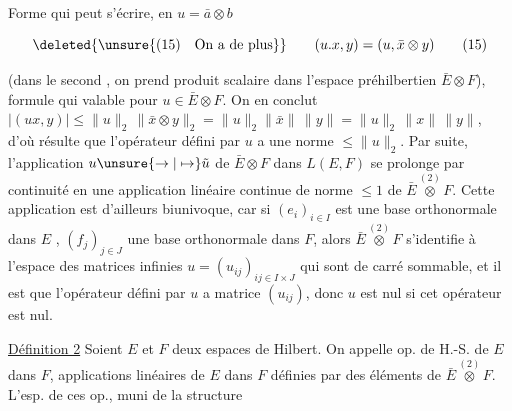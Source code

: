  Forme qui peut s'écrire, en    $u=\bar a\otimes b$


\[
\deleted{\unsure{(15)\quad\text{On a de plus}}}\qquad (u.x,y)=(u,\bar x\otimes y) \tag*{(15)}
\]

 
(dans le second , on prend  produit scalaire
dans l'espace préhilbertien $\bar E\otimes F$), formule qui
 valable  pour  $u\in\bar E\otimes F$. On en
conclut  $|(ux,y)|\leq\|u\|_2\,\|\bar x\otimes y\|_2=\|u\|_2\|\bar x\|\,\|y\|
=\|u\|_2\,\|x\|\,\|y\|$, d'où résulte que l'opérateur
défini par $u$ a une norme $\leq\|u\|_2$. Par
suite, l'application $u\unsure{\to|\mapsto}\tilde u$ de $\bar E\otimes F$ dans $L(E,F)$
se prolonge par continuité en une application linéaire
continue de  norme $\leq 1$ de $\bar E\overset{(2)}{\otimes}F$. Cette
application est d'ailleurs biunivoque, car si $(e_i)_{i\in I}$ est
une base orthonormale dans $E$ , $(f_j)_{j\in J}$ une base
orthonormale dans $F$, alors $\bar E\overset{(2)}{\otimes}F$ s'identifie
à l'espace  des matrices infinies
$u=(u_{ij})_{ij\in I\times J}$ qui sont de carré sommable,  et
il est   que l'opérateur  défini par $u$
a   matrice $(u_{ij})$, donc $u$ est nul si cet
opérateur est nul. 

\uline{Définition 2} Soient $E$ et $F$ deux espaces de Hilbert.
On appelle op. de H.-S. de $E$ dans $F$,   applications
linéaires de $E$ dans $F$ définies par des éléments
de $\bar E\overset{(2)}{\otimes} F$. L'esp. de ces op.,  muni de la structure

